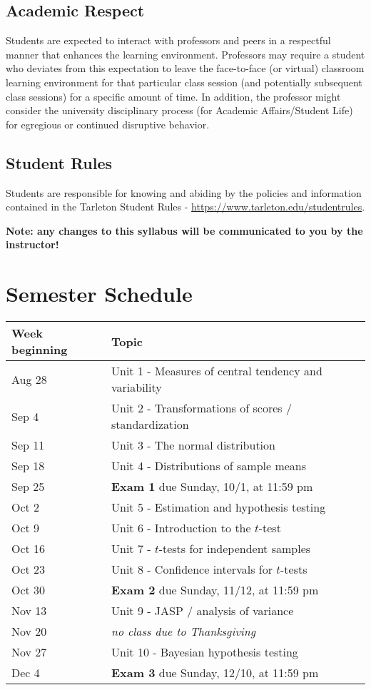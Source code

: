 \documentclass[10pt]{article}
\begin{document}
\subsection*{Academic Respect}
\label{sec:orgb374627}
Students are expected to interact with professors and peers in a respectful manner that enhances the learning environment. Professors may require a student who deviates from this expectation to leave the face-to-face (or virtual) classroom learning environment for that particular class session (and potentially subsequent class sessions) for a specific amount of time. In addition, the professor might consider the university disciplinary process (for Academic Affairs/Student Life) for egregious or continued disruptive behavior.


\subsection*{Student Rules}
\label{sec:org4dd621d}
Students are responsible for knowing and abiding by the policies and information contained in the Tarleton Student Rules - \url{https://www.tarleton.edu/studentrules}.  

\textbf{Note:  any changes to this syllabus will be communicated to you by the instructor!}

\section*{Semester Schedule}
\label{sec:org6ca93a9}

\begin{center}
\begin{tabular}{ll}
Week beginning & Topic\\[0pt]
\hline
Aug 28 & Unit 1 - Measures of central tendency and variability\\[0pt]
Sep 4 & Unit 2 - Transformations of scores / standardization\\[0pt]
Sep 11 & Unit 3 - The normal distribution\\[0pt]
Sep 18 & Unit 4 - Distributions of sample means\\[0pt]
Sep 25 & \textbf{Exam 1} due Sunday, 10/1, at 11:59 pm\\[0pt]
Oct 2 & Unit 5 - Estimation and hypothesis testing\\[0pt]
Oct 9 & Unit 6 - Introduction to the \(t\)-test\\[0pt]
Oct 16 & Unit 7 - \(t\)-tests for independent samples\\[0pt]
Oct 23 & Unit 8 - Confidence intervals for \(t\)-tests\\[0pt]
Oct 30 & \textbf{Exam 2} due Sunday, 11/12, at 11:59 pm\\[0pt]
Nov 13 & Unit 9 - JASP / analysis of variance\\[0pt]
Nov 20 & \emph{no class due to Thanksgiving}\\[0pt]
Nov 27 & Unit 10 - Bayesian hypothesis testing\\[0pt]
Dec 4 & \textbf{Exam 3} due Sunday, 12/10, at 11:59 pm\\[0pt]
\end{tabular}
\end{center}
\end{document}
